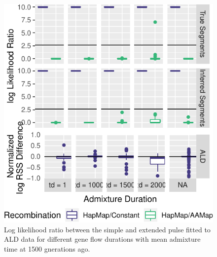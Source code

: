 \documentclass[11pt]{article}
\begin{document}
\begin{figure}
\centering
\includegraphics{ATE_Revisions_files/figure-latex/figResult2_3_supplements-1.pdf}
\caption{\label{fig:figResult3_3_supplements} Log likelihood ratio between the simple and extended pulse fitted to ALD data for different gene flow durations with mean admixture time at 1500 gnerations ago.}
\end{figure}
\end{document}
